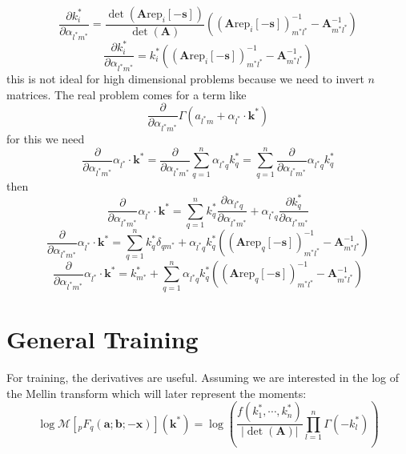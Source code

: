 \documentclass[journal=jcisd8,manuscript=article,layout=onecolumn,pdftex,floatfix,amsmath,amssymb,10pt]{achemso}
\begin{document}
\begin{equation}
\frac{\partial k^*_i}{\partial \alpha_{l^* m^*}} = \frac{\det(\mathbf{A}\mathrm{rep}_i[-\mathbf{s}])}{\det(\mathbf{A})}((\mathbf{A}\mathrm{rep}_i[-\mathbf{s}])^{-1}_{m^*l^*} - \mathbf{A}^{-1}_{m^*l^*})
\end{equation}
\begin{equation}
\frac{\partial k^*_i}{\partial \alpha_{l^* m^*}} = k_i^*((\mathbf{A}\mathrm{rep}_i[-\mathbf{s}])^{-1}_{m^*l^*} - \mathbf{A}^{-1}_{m^*l^*})
\end{equation}
this is not ideal for high dimensional problems because we need to invert $n$ matrices. The real problem comes for a term like
\begin{equation}
\frac{\partial}{\partial \alpha_{l^*m^*}} \Gamma(a_{l^*m} + \alpha_{l^*} \cdot \mathbf{k}^*)
\end{equation}
for this we need \begin{equation}
\frac{\partial}{\partial \alpha_{l^*m^*}} \alpha_{l^*} \cdot \mathbf{k}^* = \frac{\partial}{\partial \alpha_{l^*m^*}} \sum_{q=1}^n \alpha_{l^* q}k^*_q =  \sum_{q=1}^n \frac{\partial}{\partial \alpha_{l^*m^*}}\alpha_{l^* q}k^*_q
\end{equation}
then 
\begin{equation}
\frac{\partial}{\partial \alpha_{l^*m^*}} \alpha_{l^*} \cdot \mathbf{k}^* = \sum_{q=1}^n k^*_q\frac{\partial \alpha_{l^* q}}{\partial \alpha_{l^*m^*}} + \alpha_{l^* q}\frac{\partial k^*_q}{\partial \alpha_{l^*m^*}}
\end{equation}
\begin{equation}
\frac{\partial}{\partial \alpha_{l^*m^*}} \alpha_{l^*} \cdot \mathbf{k}^* = \sum_{q=1}^n k^*_q\delta_{q m^*} + \alpha_{l^* q}k_q^*((\mathbf{A}\mathrm{rep}_q[-\mathbf{s}])^{-1}_{m^*l^*} - \mathbf{A}^{-1}_{m^*l^*})
\end{equation}
\begin{equation}
\frac{\partial}{\partial \alpha_{l^*m^*}} \alpha_{l^*} \cdot \mathbf{k}^* = k^*_{m^*} + \sum_{q=1}^n \alpha_{l^* q}k_q^*((\mathbf{A}\mathrm{rep}_q[-\mathbf{s}])^{-1}_{m^*l^*} - \mathbf{A}^{-1}_{m^*l^*})
\end{equation}

\section{General Training}
For training, the derivatives are useful. Assuming we are interested in the log of the Mellin transform which will later represent the moments:
\begin{equation}
\log \mathcal{M}[_pF_q(\mathbf{a};\mathbf{b};-\mathbf{x})](\mathbf{k}^*) = \log\left(\frac{f(k_1^*,\cdots,k_n^*)}{|\det(\mathbf{A})|}\prod_{l=1}^n \Gamma(-k_l^*)\right)
\end{equation}
\end{document}
